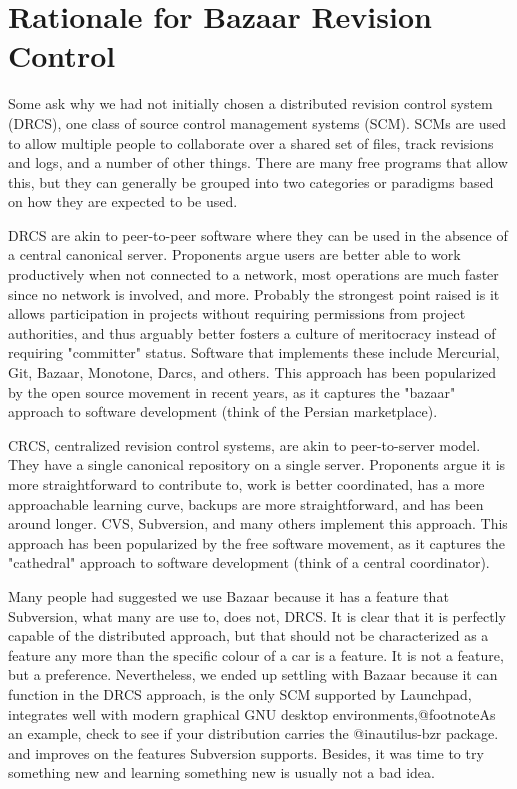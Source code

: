 \section{Rationale for Bazaar Revision Control}
Some ask why we had not initially chosen a distributed revision control system (DRCS), one class of source control management systems (SCM). SCMs are used to allow multiple people to collaborate over a shared set of files, track revisions and logs, and a number of other things. There are many free programs that allow this, but they can generally be grouped into two categories or paradigms based on how they are expected to be used.

DRCS are akin to peer-to-peer software where they can be used in the absence of a central canonical server. Proponents argue users are better able to work productively when not connected to a network, most operations are much faster since no network is involved, and more. Probably the strongest point raised is it allows participation in projects without requiring permissions from project authorities, and thus arguably better fosters a culture of meritocracy instead of requiring "committer" status. Software that implements these include Mercurial, Git, Bazaar, Monotone, Darcs, and others. This approach has been popularized by the open source movement in recent years, as it captures the "bazaar" approach to software development (think of the Persian marketplace).

CRCS, centralized revision control systems, are akin to peer-to-server model. They have a single canonical repository on a single server. Proponents argue it is more straightforward to contribute to, work is better coordinated, has a more approachable learning curve, backups are more straightforward, and has been around longer. CVS, Subversion, and many others implement this approach. This approach has been popularized by the free software movement, as it captures the "cathedral" approach to software development (think of a central coordinator).

Many people had suggested we use Bazaar because it has a feature that Subversion, what many are use to, does not, DRCS. It is clear that it is perfectly capable of the distributed approach, but that should not be characterized as a feature any more than the specific colour of a car is a feature. It is not a feature, but a preference. Nevertheless, we ended up settling with Bazaar because it can function in the DRCS approach, is the only SCM supported by Launchpad, integrates well with modern graphical GNU desktop environments,@footnote{As an example, check to see if your distribution carries the @i{nautilus-bzr} package.} and improves on the features Subversion supports. Besides, it was time to try something new and learning something new is usually not a bad idea.

